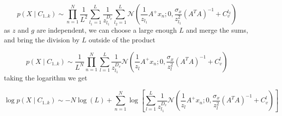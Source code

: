\documentclass{paper}
\begin{document}
\begin{equation}
p(X \mid C_{1..k}) \sim \prod_{n=1}^N  \frac{1}{L^2} \sum_{l_1=1}^L \frac{1}{z_{l_1}^{D_v}}  \sum_{l_2=1}^L \mathcal{N}(\frac{1}{z_{l_1}} A^{+}x_n; 0,\frac{\sigma_x}{z_{l_1}^2} (A^T A)^{-1} + C_v^{l_2})
\end{equation}
% 
as $z$ and $g$ are independent, we can choose a large enough $L$ and merge the sums, and bring the division by $L$ outside of the product

\begin{equation}
p(X \mid C_{1..k}) \sim \frac{1}{L^N} \prod_{n=1}^N  \sum_{l=1}^L \frac{1}{z_{l_1}^{D_v}}  \mathcal{N}(\frac{1}{z_l} A^{+}x_n; 0,\frac{\sigma_x}{z_l^2} (A^T A)^{-1} + C_v^l)
\end{equation}
%
taking the logarithm we get

\begin{equation}
\log p(X \mid C_{1..k}) \sim - N \log(L) + \sum_{n=1}^N \log \left[ \sum_{l=1}^L \frac{1}{z_{l_1}^{D_v}}  \mathcal{N}(\frac{1}{z_l} A^{+}x_n; 0,\frac{\sigma_x}{z_l^2} (A^T A)^{-1} + C_v^l) \right]
\end{equation}
\end{document}
